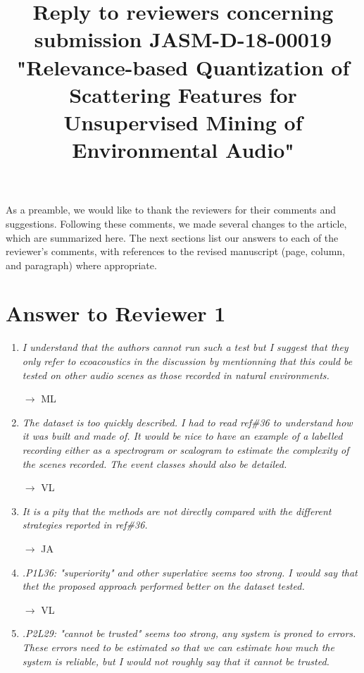 \documentclass[10pt]{article}
\title{Reply to reviewers concerning submission JASM-D-18-00019 "Relevance-based Quantization of Scattering Features for Unsupervised Mining of Environmental Audio"}
\begin{document}
\maketitle

As a preamble, we would like to thank the reviewers for their comments and suggestions. Following these comments, we made several changes to the article, which are summarized here. The next sections list our answers to each of the reviewer’s comments, with references to the revised manuscript (page, column, and paragraph) where appropriate.

\section{Answer to Reviewer 1}

\begin{enumerate}

\item \emph{I understand that the authors cannot run such a test but I suggest that they only refer to ecoacoustics in the discussion by mentionning that this could be tested on other audio scenes as those recorded in natural environments.}

$\rightarrow$ ML

\item \emph{The dataset is too quickly described. I had to read ref\#36 to understand how it was built and made of. It would be nice to have an example of a labelled recording either as a spectrogram or scalogram to estimate the complexity of the scenes recorded. The event classes should also be detailed.}

$\rightarrow$ VL

\item \emph{It is a pity that the methods are not directly compared with the different strategies reported in ref\#36.}

$\rightarrow$ JA

\item \emph{.P1L36: "superiority" and other superlative seems too strong. I would say that thet the proposed approach performed better on the dataset tested.}

$\rightarrow$ VL

\item \emph{.P2L29: "cannot be trusted" seems too strong, any system is proned to errors. These errors need to be estimated so that we can estimate how much the system is reliable, but I would not roughly say that it cannot be trusted.}


\end{enumerate}
\end{document}
